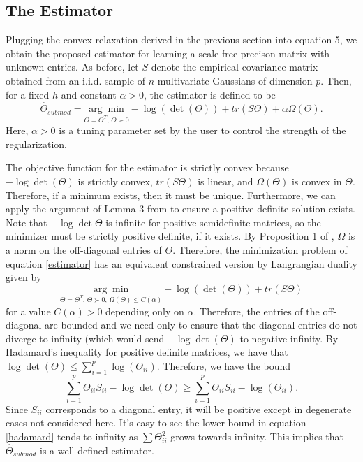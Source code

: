 \documentclass{uwstat572}
\newcommand{\vmadd}[1]{\textbf{\color{red}{#1}}}
\theoremstyle{remark}
\theoremstyle{definition}
\begin{document}
\subsection{The Estimator}

Plugging the convex relaxation derived in the previous section into equation 5, we obtain the proposed estimator for learning a scale-free precison matrix with unknown entries.  As before, let $S$ denote the empirical covariance matrix obtained from an i.i.d. sample of $n$ multivariate Gaussians of dimension $p$.  Then, for a fixed $h$ and constant $\alpha > 0$, the estimator is defined to be
\begin{equation}\label{estimator}
\widehat{\Theta}_{submod} = \underset{\Theta = \Theta^T, \, \Theta \succ 0}{\arg \min} - \log(\det(\Theta)) + tr(S \Theta) + \alpha \Omega(\Theta).
\end{equation}
Here, $\alpha > 0$ is a tuning parameter set by the user to control the strength of the regularization.  

The objective function for the estimator is strictly convex because $- \log \det(\Theta)$ is strictly convex, $tr(S \Theta)$ is linear, and $\Omega(\Theta)$ is convex in $\Theta$.  Therefore, if a minimum exists, then it must be unique.  Furthermore, we can apply the argument of Lemma 3 from \cite{ravikumar2011} to ensure a positive definite solution exists.  Note that $- \log \det \Theta$ is infinite for positive-semidefinite matrices, so the minimizer must be strictly positive definite, if it exists.  By Proposition 1 of \cite{bach2010}, $\Omega$ is a norm on the off-diagonal entries of $\Theta$.  Therefore, the minimization problem of equation \eqref{estimator} has an equivalent constrained version by Langrangian duality given by
\begin{equation}
\underset{\Theta = \Theta^T, \, \Theta \succ 0, \, \Omega(\Theta) \leq C(\alpha)}{\arg \min} - \log(\det(\Theta)) + tr(S \Theta)
\end{equation}
for a value $C(\alpha) > 0$ depending only on $\alpha$. Therefore, the entries of the off-diagonal are bounded and we need only to ensure that the diagonal entries do not diverge to infinity (which would send $- \log \det (\Theta)$ to negative infinity\vmadd{)}.  By Hadamard's inequality for positive definite matrices, we have that $\log \det (\Theta) \leq \sum_{i=1}^p \log (\Theta_{ii})$.  Therefore, we have the bound
\begin{equation}\label{hadamard}
\sum_{i=1}^p \Theta_{ii} S_{ii} - \log \det (\Theta) \geq \sum_{i=1}^p\Theta_{ii} S_{ii} - \log (\Theta_{ii}).
\end{equation}
Since $S_{ii}$ corresponds to a diagonal entry, it will be positive except in degenerate cases not considered here.  It's easy to see the lower bound in equation \eqref{hadamard} tends to infinity as $\sum \Theta_{ii}^2$ grows towards infinity.  This implies that $\widehat{\Theta}_{submod}$ is a well defined estimator.
\end{document}
